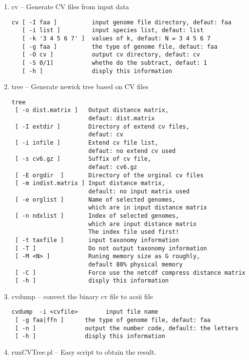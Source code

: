\documentclass[a4paper,12pt]{article}
\begin{document}
\begin{enumerate}\itemsep 0pt
  \item cv -- Generate CV files from input data
\begin{verbatim}
cv [ -I faa ]          input genome file directory, defaut: faa
   [ -i list ]         input species list, defaut: list
   [ -k '3 4 5 6 7' ]  values of k, defaut: N = 3 4 5 6 7
   [ -g faa ]          the type of genome file, defaut: faa
   [ -O cv ]           output cv directory, defaut: cv
   [ -S 0/1]           whethe do the subtract, defaut: 1
   [ -h ]              disply this information
\end{verbatim}

  \item tree -- Generate newick tree based on CV files
\begin{verbatim}
tree
 [ -o dist.matrix ]   Output distance matrix, 
                      defaut: dist.matrix
 [ -I extdir ]        Directory of extend cv files, 
                      defaut: cv
 [ -i infile ]        Extend cv file list, 
                      defaut: no extend cv used
 [ -s cv6.gz ]        Suffix of cv file, 
                      defaut: cv6.gz
 [ -E orgdir  ]       Directory of the orginal cv files
 [ -m indist.matrix ] Input distance matrix, 
                      default: no input matrix used
 [ -e orglist ]       Name of selected genomes, 
                      which are in input distance matrix
 [ -n ndxlist ]       Index of selected genomes, 
                      which are input distance matrix
                      The index file used first!
 [ -t taxfile ]       input taxonomy information
 [ -T ]               Do not output taxonomy information
 [ -M <N> ]           Runing memory size as G roughly, 
                      default 80% physical memory
 [ -C ]               Force use the netcdf compress distance matrix
 [ -h ]               disply this information
\end{verbatim}
\item cvdump -- convect the binary cv file to acsii file
\begin{verbatim}
cvdump  -i <cvfile>        input file name
 [ -g faa|ffn ]      the type of genome file, defaut: faa
 [ -n ]              output the number code, default: the letters
 [ -h ]              disply this information
\end{verbatim}

  \item runCVTree.pl -- Easy script to obtain the result.
\end{enumerate}
\end{document}
